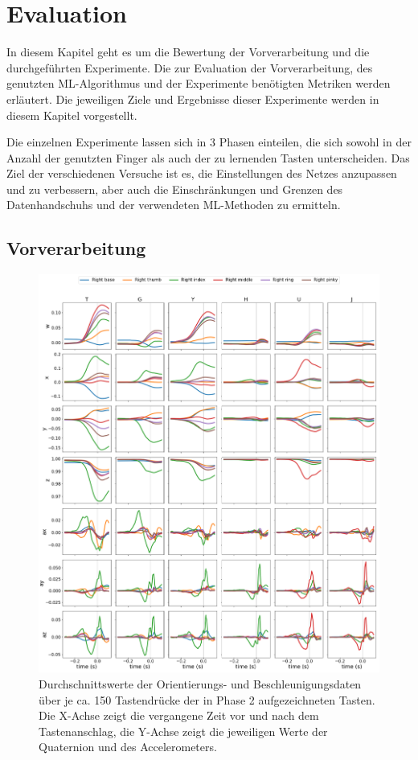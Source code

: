 \chapter{Evaluation}

In diesem Kapitel geht es um die Bewertung der Vorverarbeitung und die durchgeführten Experimente. Die zur Evaluation der Vorverarbeitung, des genutzten ML-Algorithmus und der Experimente benötigten Metriken werden erläutert. Die jeweiligen Ziele und Ergebnisse dieser Experimente werden in diesem Kapitel vorgestellt.

Die einzelnen Experimente lassen sich in 3 Phasen einteilen, die sich sowohl in der Anzahl der genutzten Finger als auch der zu lernenden Tasten unterscheiden. Das Ziel der verschiedenen Versuche ist es, die Einstellungen des Netzes anzupassen und zu verbessern, aber auch die Einschränkungen und Grenzen des Datenhandschuhs und der verwendeten ML-Methoden zu ermitteln.

\section{Vorverarbeitung}

\begin{figure}[p]
    \centering
    \advance\leftskip-2cm
    \includegraphics[width=17cm]{../common/images/graphs-average}
    \caption[Durchschnittswerte verschiedener Tasten]{Durchschnittswerte der Orientierungs- und Beschleunigungsdaten über je ca. 150 Tastendrücke der in Phase 2 aufgezeichneten Tasten. Die X-Achse zeigt die vergangene Zeit vor und nach dem Tastenanschlag, die Y-Achse zeigt die jeweiligen Werte der Quaternion und des Accelerometers.}
    \label{fig:graphs-average}
\end{figure}

